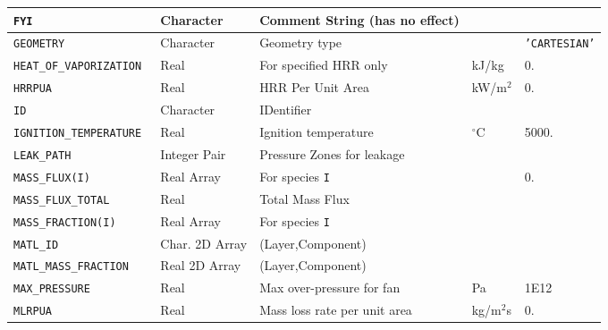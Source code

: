 \documentclass[11pt]{book}
\newcommand{\ct}{\tt\small}
\begin{document}
\begin{longtable}{|l|l|l|l|l|}
{\ct FYI}                             & Character       & Comment String (has no effect)    &                     &                         \\ \hline
{\ct GEOMETRY}                        & Character       & Geometry type                     &                     & {\ct 'CARTESIAN'}       \\ \hline
{\ct HEAT\_OF\_VAPORIZATION }         & Real            & For specified HRR only            & kJ/kg               & 0.                      \\ \hline
{\ct HRRPUA }                         & Real            & HRR Per Unit Area                 & kW/m$^2$            & 0.                      \\ \hline
{\ct ID     }                         & Character       & IDentifier                        &                     &                         \\ \hline
{\ct IGNITION\_TEMPERATURE}           & Real            & Ignition temperature              & $^\circ$C           & 5000.                   \\ \hline
{\ct LEAK\_PATH}                      & Integer Pair    & Pressure Zones for leakage        &                     &                         \\ \hline
{\ct MASS\_FLUX(I)}                   & Real Array      & For species {\ct I}               &                     & 0.                      \\ \hline
{\ct MASS\_FLUX\_TOTAL}               & Real            & Total Mass Flux                   &                     &                         \\ \hline
{\ct MASS\_FRACTION(I)}               & Real Array      & For species {\ct I}               &                     &                         \\ \hline
{\ct MATL\_ID}                        & Char. 2D Array  & (Layer,Component)                 &                     &                         \\ \hline
{\ct MATL\_MASS\_FRACTION}            & Real 2D Array   & (Layer,Component)                 &                     &                         \\ \hline
{\ct MAX\_PRESSURE }                  & Real            & Max over-pressure for fan         & Pa                  & 1E12                    \\ \hline
{\ct MLRPUA }                         & Real            & Mass loss rate per unit area      & kg/m$^2$s           & 0.                      \\ \hline

\end{longtable}
\end{document}
